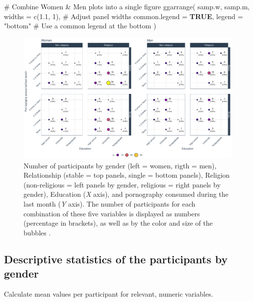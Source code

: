 \documentclass[
  bookmarksnumbered]{article}
\newenvironment{Shaded}{\begin{snugshade}}{\end{snugshade}}
\newcommand{\AttributeTok}[1]{\textcolor[rgb]{0.80,0.80,0.80}{#1}}
\newcommand{\CommentTok}[1]{\textcolor[rgb]{0.50,0.62,0.50}{#1}}
\newcommand{\ConstantTok}[1]{\textcolor[rgb]{0.86,0.64,0.64}{\textbf{#1}}}
\newcommand{\DecValTok}[1]{\textcolor[rgb]{0.86,0.86,0.80}{#1}}
\newcommand{\FloatTok}[1]{\textcolor[rgb]{0.75,0.75,0.82}{#1}}
\newcommand{\FunctionTok}[1]{\textcolor[rgb]{0.94,0.94,0.56}{#1}}
\newcommand{\NormalTok}[1]{\textcolor[rgb]{0.80,0.80,0.80}{#1}}
\newcommand{\StringTok}[1]{\textcolor[rgb]{0.80,0.58,0.58}{#1}}
\begin{document}
\begin{Shaded}
\begin{Highlighting}[]
\CommentTok{\# Combine Women \& Men plots into a single figure}
\FunctionTok{ggarrange}\NormalTok{(}
\NormalTok{  samp.w, samp.m,}
  \AttributeTok{widths =} \FunctionTok{c}\NormalTok{(}\FloatTok{1.1}\NormalTok{, }\DecValTok{1}\NormalTok{), }\CommentTok{\# Adjust panel widths}
  \AttributeTok{common.legend =} \ConstantTok{TRUE}\NormalTok{, }\AttributeTok{legend =} \StringTok{"bottom"} \CommentTok{\# Use a common legend at the bottom}
\NormalTok{)}
\end{Highlighting}
\end{Shaded}

\begin{figure}
\centering
\includegraphics{Sexual_Desire_Arousal_files/figure-latex/sample-plot-1.pdf}
\caption{\label{fig:sample-plot}Number of participants by gender (left = women, rigth = men), Relationship (stable = top panels, single = bottom panels), Religion (non-religious = left panels by gender, religious = right panels by gender), Education (\emph{X} axis), and pornography consumed during the last month (\emph{Y} axis). The number of participants for each combination of these five variables is displayed as numbers (percentage in brackets), as well as by the color and size of the bubbles .}
\end{figure}

\subsection{Descriptive statistics of the participants by gender}\label{descriptive-statistics-of-the-participants-by-gender}

Calculate mean values per participant for relevant, numeric variables.
\end{document}
